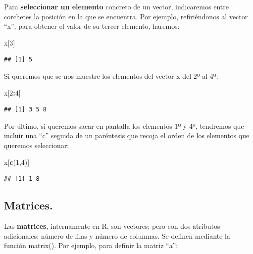 \documentclass[
]{book}
\newenvironment{Shaded}{\begin{snugshade}}{\end{snugshade}}
\newcommand{\DecValTok}[1]{\textcolor[rgb]{0.00,0.00,0.81}{#1}}
\newcommand{\FunctionTok}[1]{\textcolor[rgb]{0.13,0.29,0.53}{\textbf{#1}}}
\newcommand{\NormalTok}[1]{#1}
\newcommand{\SpecialCharTok}[1]{\textcolor[rgb]{0.81,0.36,0.00}{\textbf{#1}}}
\begin{document}
Para \textbf{seleccionar un elemento} concreto de un vector, indicaremos entre corchetes la posición en la que se encuentra. Por ejemplo, refiriéndonos al vector ``x'', para obtener el valor de su tercer elemento, haremos:

\begin{Shaded}
\begin{Highlighting}[]
\NormalTok{x[}\DecValTok{3}\NormalTok{]}
\end{Highlighting}
\end{Shaded}

\begin{verbatim}
## [1] 5
\end{verbatim}

Si queremos que se nos muestre los elementos del vector x del 2º al 4º:

\begin{Shaded}
\begin{Highlighting}[]
\NormalTok{x[}\DecValTok{2}\SpecialCharTok{:}\DecValTok{4}\NormalTok{]}
\end{Highlighting}
\end{Shaded}

\begin{verbatim}
## [1] 3 5 8
\end{verbatim}

Por último, si queremos sacar en pantalla los elementos 1º y 4º, tendremos que incluir una ``c'' seguida de un paréntesis que recoja el orden de los elementos que queremos seleccionar:

\begin{Shaded}
\begin{Highlighting}[]
\NormalTok{x[}\FunctionTok{c}\NormalTok{(}\DecValTok{1}\NormalTok{,}\DecValTok{4}\NormalTok{)]}
\end{Highlighting}
\end{Shaded}

\begin{verbatim}
## [1] 1 8
\end{verbatim}

\subsection{Matrices.}\label{matrices.}

Las \textbf{matrices}, internamente en R, son vectores; pero con dos atributos adicionales: número de filas y número de columnas. Se definen mediante la función matrix(). Por ejemplo, para definir la matriz ``a'':
\end{document}
